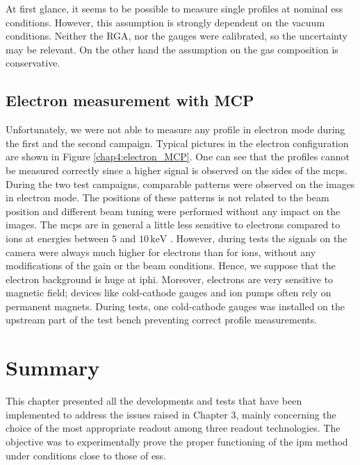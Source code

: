 \begin{refsection}
  At first glance, it seems to be possible to measure single profiles at nominal \acrshort{ess} conditions. However, this assumption is strongly dependent on the vacuum conditions. Neither the RGA, nor the gauges were calibrated, so the uncertainty may be relevant. On the other hand the assumption on the gas composition is conservative.

  

  \FloatBarrier
  \subsection{Electron measurement with MCP}
  Unfortunately, we were not able to measure any profile in electron mode during the first and the second campaign.
  Typical pictures in the electron configuration are shown in Figure \ref{chap4:electron_MCP}. One can see that the profiles cannot be measured correctly since a higher signal is observed on the sides of the \acrshort{mcp}s. During the two test campaigns, comparable patterns were observed on the images in electron mode. The positions of these patterns is not related to the beam position and different beam tuning were performed without any impact on the images.
  The \acrshort{mcp}s are in general a little less sensitive to electrons compared to ions at energies between $5$ and $10\,\mathrm{keV}$ \cite{Wiza1979}.
  However, during tests the signals on the camera were always much higher for electrons than for ions, without any modifications of the gain or the beam conditions. Hence, we suppose that the electron background is huge at \acrshort{iphi}.
  Moreover, electrons are very sensitive to magnetic field; devices like cold-cathode gauges and ion pumps often rely on permanent magnets. During tests, one cold-cathode gauges was installed on the upstream part of the test bench preventing correct profile measurements.
  
  

  \section{Summary}
  \label{ch4:Summary}
  This chapter presented all the developments and tests that have been implemented to address the issues raised in Chapter 3, mainly concerning the choice of the most appropriate readout among three readout technologies. The objective was to experimentally prove the proper functioning of the \acrshort{ipm} method under conditions close to those of \acrshort{ess}.


\end{refsection}
